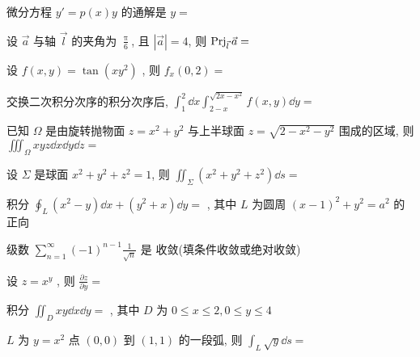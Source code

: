 \begin{ti}
	微分方程 $y'=p(x) y$ 的通解是 $y=$ \hua{}
\end{ti}

\begin{ti}
	设 $\vec{a}$ 与轴 $\vec{l}$ 的夹角为 $\frac{\uppi}{6}$, 且 $|\vec{a}|=4$, 则 $\operatorname{Prj}_{\vec{l}} \vec{a}=$ \hua{}
\end{ti}

\begin{ti}
	设 $f(x, y)=\tan \left(x y^{2}\right)$ , 则 $f_{x}(0,2)=$ \hua{}
\end{ti}

\begin{ti}
	交换二次积分次序的积分次序后, $\int_{1}^{2} \dd{x} \int_{2-x}^{\sqrt{2 x-x^{2}}} f(x, y) \dd{y}=$ \hua{}
\end{ti}

\begin{ti}
	已知 $\Omega$ 是由旋转抛物面 $z=x^{2}+y^{2}$ 与上半球面 $z=\sqrt{2-x^{2}-y^{2}}$ 围成的区域, 则 $\iiint_{\Omega} x y z \dd{x} \dd{y} \dd{z}=$ \hua{}
\end{ti}

\begin{ti}
	设 $\Sigma$ 是球面 $x^{2}+y^{2}+z^{2}=1$, 则 $\iint_{\Sigma}\left(x^{2}+y^{2}+z^{2}\right) \dd{s}=$ \hua{}
\end{ti}

\begin{ti}
	积分 $\oint_{L}\left(x^{2}-y\right) \dd{x}+\left(y^{2}+x\right) \dd{y}=$ \hua{}, 其中 $L$ 为圆周 $(x-1)^{2}+y^{2}=a^{2}$ 的正向
\end{ti}

\begin{ti}
	级数 $\sum_{n=1}^{\infty}(-1)^{n-1} \frac{1}{\sqrt{n}}$ 是 \hua{}收敛(填条件收敛或绝对收敛)
\end{ti}

\begin{ti}
	设 $z=x^{y}$ , 则 $\frac{\partial z}{\partial y}=$ \hua{}
\end{ti}

\begin{ti}
	积分 $\iint_{D} x y \dd{x} \dd{y}=$ \hua{}, 其中 $D$ 为 $0 \leqslant x \leqslant 2, 0 \leqslant y \leqslant 4$
\end{ti}

\begin{ti}
	$L$ 为 $y=x^2$ 点 $(0,0)$ 到 $(1,1)$ 的一段弧, 则 $\int_{L} \sqrt{y} \dd{s}=$ \hua{}
\end{ti}


